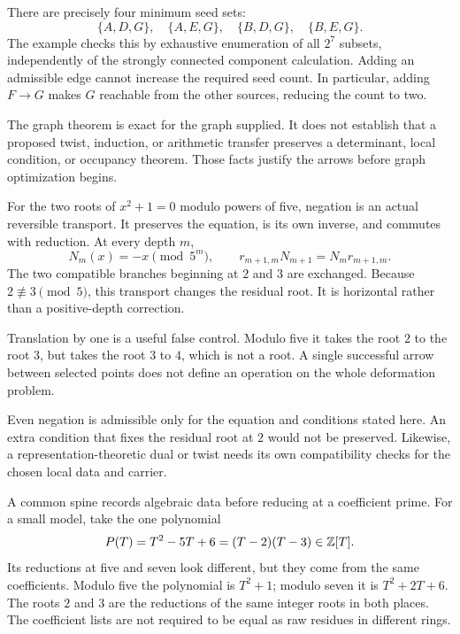 There are precisely four minimum seed sets:
\[
\{A,D,G\},\quad\{A,E,G\},\quad
\{B,D,G\},\quad\{B,E,G\}.
\]
The example checks this by exhaustive enumeration of all $2^7$ subsets, independently of the strongly connected component calculation. Adding an admissible edge cannot increase the required seed count. In particular, adding $F\to G$ makes $G$ reachable from the other sources, reducing the count to two.

The graph theorem is exact for the graph supplied. It does not establish that a proposed twist, induction, or arithmetic transfer preserves a determinant, local condition, or occupancy theorem. Those facts justify the arrows before graph optimization begins.

For the two roots of $x^2+1=0$ modulo powers of five, negation is an actual reversible transport. It preserves the equation, is its own inverse, and commutes with reduction.
At every depth $m$,
\[
N_m(x)=-x\pmod{5^m},\qquad
r_{m+1,m}N_{m+1}=N_mr_{m+1,m}.
\]
The two compatible branches beginning at $2$ and $3$ are exchanged. Because $2\not\equiv3\pmod5$, this transport changes the residual root. It is horizontal rather than a positive-depth correction.

Translation by one is a useful false control. Modulo five it takes the root $2$ to the root $3$, but takes the root $3$ to $4$, which is not a root. A single successful arrow between selected points does not define an operation on the whole deformation problem.

Even negation is admissible only for the equation and conditions stated here. An extra condition that fixes the residual root at $2$ would not be preserved. Likewise, a representation-theoretic dual or twist needs its own compatibility checks for the chosen local data and carrier.

A common spine records algebraic data before reducing at a coefficient prime. For a small model, take the one polynomial
\[
P(T)=T^2-5T+6=(T-2)(T-3)\in\mathbb Z[T].
\]
Its reductions at five and seven look different, but they come from the same coefficients.
Modulo five the polynomial is $T^2+1$; modulo seven it is $T^2+2T+6$. The roots $2$ and $3$ are the reductions of the same integer roots in both places. The coefficient lists are not required to be equal as raw residues in different rings.

